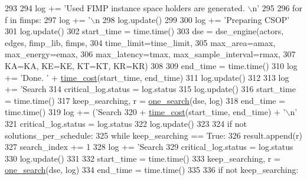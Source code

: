 \begin{DoxyCode}
{{{{{{{{{{{{293 
294             log += \textcolor{stringliteral}{'Used FIMP instance space holders are generated. \(\backslash\)n'}
295 
296             \textcolor{keywordflow}{for} f \textcolor{keywordflow}{in} fimps:
297                 log += \textcolor{stringliteral}{'\(\backslash\)n  %
298             log.update()
299 
300             log += \textcolor{stringliteral}{'Preparing CSOP'}
301             log.update()
302             start\_time = time.time()
303             dse = dse\_engine(actors, edges, fimp\_lib, fimps,
304                              time\_limit=time\_limit,
305                              max\_area=amax, max\_energy=emax,
306                              max\_latency=tmax, max\_sample\_interval=rmax,
307                              KA=KA, KE=KE, KT=KT, KR=KR)
308 
309             end\_time = time.time()
310             log += \textcolor{stringliteral}{'Done. '} + \hyperlink{namespacesylva_1_1dse_1_1dse_acf83688e18cc0859483b4c9bb70183fd}{time\_cost}(start\_time, end\_time)
311             log.update()
312 
313             log += \textcolor{stringliteral}{'Search %
314             critical\_log.status = log.status
315             log.update()
316             start\_time = time.time()
317             keep\_searching, r = \hyperlink{namespacesylva_1_1dse_1_1dse_a27653b05dda8ab9dab8aa948db5b860a}{one\_search}(dse, log)
318             end\_time = time.time()
319             log += (\textcolor{stringliteral}{'Search %
320                 + \hyperlink{namespacesylva_1_1dse_1_1dse_acf83688e18cc0859483b4c9bb70183fd}{time\_cost}(start\_time, end\_time) + \textcolor{stringliteral}{'\(\backslash\)n'}
321             critical\_log.status = log.status
322             log.update()
323 
324             \textcolor{keywordflow}{if} \textcolor{keywordflow}{not} solutions\_per\_schedule:
325                 \textcolor{keywordflow}{while} keep\_searching == \textcolor{keyword}{True}:
326                     result.append(r)
327                     search\_index += 1
328                     log += \textcolor{stringliteral}{'Search %
329                     critical\_log.status = log.status
330                     log.update()
331 
332                     start\_time = time.time()
333                     keep\_searching, r = \hyperlink{namespacesylva_1_1dse_1_1dse_a27653b05dda8ab9dab8aa948db5b860a}{one\_search}(dse, log)
334                     end\_time = time.time()
335 
336                     \textcolor{keywordflow}{if} \textcolor{keywordflow}{not} keep\_searching:
}}}}}}}}}}}}}}}}
\end{DoxyCode}
